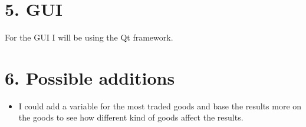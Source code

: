 \documentclass{article}
\begin{document}
\section{5. GUI}
For the GUI I will be using the Qt framework.

\section{6. Possible additions}
\begin{itemize}
  \item I could add a variable for the most traded goods and base the results more on the goods to see how different kind of goods affect the results. 
\end{itemize}





\end{document}
